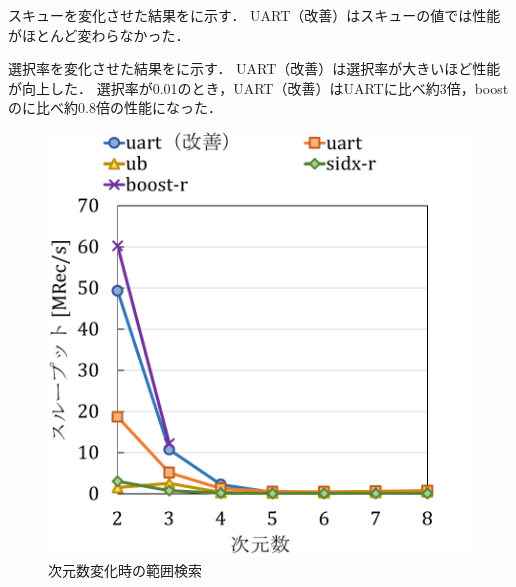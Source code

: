 スキューを変化させた結果を\Fig{\ref{graph:skew-sc}}に示す．
UART（改善）はスキューの値では性能がほとんど変わらなかった．


選択率を変化させた結果を\Fig{\ref{graph:selectivity-sc}}に示す．
UART（改善）は選択率が大きいほど性能が向上した．
選択率が0.01のとき，UART（改善）はUARTに比べ約3倍，boostの\RTree に比べ約0.8倍の性能になった．



\begin{figure}[tb]
  \begin{minipage}[c]{0.495\textwidth}
    \centering
    \includegraphics[scale=0.5]{./figures/graph-scan-dimenntion.pdf}
    \caption{次元数変化時の範囲検索}
    \label{graph:dim-sc}
  \end{minipage}
  \begin{minipage}[c]{0.495\textwidth}
    \centering

\end{minipage}
\end{figure}
